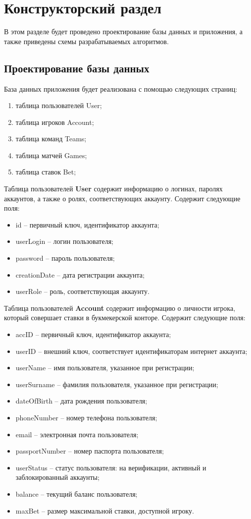 \chapter{Конструкторский раздел}
В этом разделе будет проведено проектирование базы данных и приложения, а также приведены схемы разрабатываемых алгоритмов.

\section{Проектирование базы данных}
База данных приложения будет реализована с помощью следующих страниц:
\begin{enumerate}
	\item таблица пользователей User;
	\item таблица игроков Account;
	\item таблица команд Teams;
	\item таблица матчей Games;
	\item таблица ставок Bet;
\end{enumerate}

Таблица пользователей \textbf{User} содержит информацию о логинах, паролях аккаунтов, а также о ролях, соответствующих аккаунту.
Содержит следующие поля:
\begin{itemize}
	\item id -- первичный ключ, идентификатор аккаунта;
	\item userLogin -- логин пользователя;
	\item password -- пароль пользователя;
	\item creationDate -- дата регистрации аккаунта;
	\item userRole -- роль, соответствующая аккаунту.
\end{itemize}

Таблица пользователей \textbf{Account} содержит информацию о личности игрока, который совершает ставки в букмекерской конторе.
Содержит следующие поля:
\begin{itemize}
	\item accID -- первичный ключ, идентификатор аккаунта;
	\item userID -- внешний ключ, соответствует идентификаторам интернет аккаунта;
	\item userName -- имя пользователя, указанное при регистрации;
	\item userSurname -- фамилия пользователя, указанное при регистрации;
	\item dateOfBirth -- дата рождения пользователя;
	\item phoneNumber -- номер телефона пользователя;
	\item email -- электронная почта пользователя;
	\item passportNumber -- номер паспорта пользователя;
	\item userStatus -- статус пользователя: на верификации, активный и заблокированный аккаунты;
	\item balance -- текущий баланс пользователя;
	\item maxBet -- размер максимальной ставки, доступной игроку.
\end{itemize}

